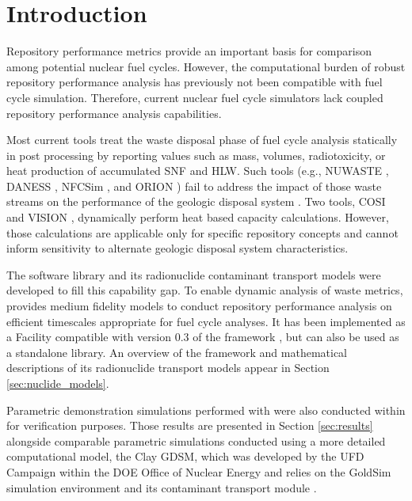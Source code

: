 \section{Introduction}\label{sec:introduction}
Repository performance metrics provide an important basis for comparison among
potential nuclear fuel cycles.
However, the computational
burden of robust repository performance analysis has previously not been
compatible with fuel cycle simulation.
Therefore, current nuclear fuel cycle simulators
lack coupled repository performance analysis capabilities.

Most current tools treat the waste disposal
phase of fuel cycle analysis statically in post processing by reporting
values such as mass, volumes, radiotoxicity, or heat production of accumulated
\gls{SNF} and \gls{HLW}. Such tools
(e.g.,
\gls{NUWASTE} \cite{abkowitz_nuclear_2010},
\gls{DANESS} \cite{van_den_durpel_daness:_2006},
\gls{NFCSim} \cite{schneider_nfcsim_2004}, and
ORION \cite{gregg_orion_2011})
fail to address the impact of those waste streams on the performance of the
geologic disposal system \cite{wilson_comparing_2011}.  Two tools, \gls{COSI}
\cite{boucher_international_2010} and \gls{VISION} \cite{yacout_vision_2006,
wilson_comparing_2011, radel_repository_2007, boucher_international_2010},
dynamically perform heat based capacity calculations.
However, those calculations are applicable only for specific
repository concepts and cannot inform sensitivity to alternate geologic disposal
system characteristics.

The \Cyder software library \cite{huff_cyder_2013} and its radionuclide
contaminant transport models were  developed to fill this capability gap.  To
enable dynamic analysis of waste metrics, \Cyder provides medium fidelity
models to conduct repository performance analysis on efficient timescales
appropriate for fuel cycle analyses. It has been implemented as a Facility
compatible with version 0.3 of the \Cyclus framework
\cite{wilson_cyclus:_2012}, but can also be used as a standalone library.  An
overview of the \Cyder framework and mathematical descriptions of its
radionuclide transport models appear in Section \ref{sec:nuclide_models}.

Parametric demonstration simulations performed with \Cyder were also conducted
within \Cyclus for verification purposes. Those results are presented in
Section \ref{sec:results} alongside comparable parametric simulations conducted
using a more detailed computational model, the Clay \gls{GDSM}, which was
developed by the \gls{UFD} Campaign within the \gls{DOE} Office of Nuclear
Energy \cite{clayton_generic_2011} and relies on the GoldSim simulation
environment \cite{golder_associates_goldsim_2010-1} and its contaminant
transport module \cite{golder_associates_goldsim_2010-1}.

